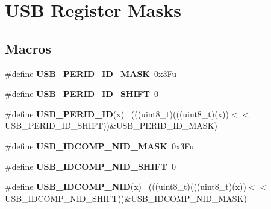 \hypertarget{group___u_s_b___register___masks}{}\section{U\+S\+B Register Masks}
\label{group___u_s_b___register___masks}
\subsection*{Macros}
\begin{DoxyCompactItemize}
\item 
\hypertarget{group___u_s_b___register___masks_ga7c4ef4c7ba738b9ec7ee90c6c482c1e5}{}\#define {\bfseries U\+S\+B\+\_\+\+P\+E\+R\+I\+D\+\_\+\+I\+D\+\_\+\+M\+A\+S\+K}~0x3\+Fu\label{group___u_s_b___register___masks_ga7c4ef4c7ba738b9ec7ee90c6c482c1e5}

\item 
\hypertarget{group___u_s_b___register___masks_ga15b2af97cadcb108b2489e2d29e8957e}{}\#define {\bfseries U\+S\+B\+\_\+\+P\+E\+R\+I\+D\+\_\+\+I\+D\+\_\+\+S\+H\+I\+F\+T}~0\label{group___u_s_b___register___masks_ga15b2af97cadcb108b2489e2d29e8957e}

\item 
\hypertarget{group___u_s_b___register___masks_ga9866908546596794c6ec34ce8e7ee9ab}{}\#define {\bfseries U\+S\+B\+\_\+\+P\+E\+R\+I\+D\+\_\+\+I\+D}(x)                                                ~(((uint8\+\_\+t)(((uint8\+\_\+t)(x))$<$$<$U\+S\+B\+\_\+\+P\+E\+R\+I\+D\+\_\+\+I\+D\+\_\+\+S\+H\+I\+F\+T))\&U\+S\+B\+\_\+\+P\+E\+R\+I\+D\+\_\+\+I\+D\+\_\+\+M\+A\+S\+K)\label{group___u_s_b___register___masks_ga9866908546596794c6ec34ce8e7ee9ab}

\item 
\hypertarget{group___u_s_b___register___masks_ga91e5cef0c6203ea503c01ecb0f392819}{}\#define {\bfseries U\+S\+B\+\_\+\+I\+D\+C\+O\+M\+P\+\_\+\+N\+I\+D\+\_\+\+M\+A\+S\+K}~0x3\+Fu\label{group___u_s_b___register___masks_ga91e5cef0c6203ea503c01ecb0f392819}

\item 
\hypertarget{group___u_s_b___register___masks_gabb5fe5f72dcf289ba2d624ed18f8f07a}{}\#define {\bfseries U\+S\+B\+\_\+\+I\+D\+C\+O\+M\+P\+\_\+\+N\+I\+D\+\_\+\+S\+H\+I\+F\+T}~0\label{group___u_s_b___register___masks_gabb5fe5f72dcf289ba2d624ed18f8f07a}

\item 
\hypertarget{group___u_s_b___register___masks_ga45629f99413060a8de87dd44e42f4f31}{}\#define {\bfseries U\+S\+B\+\_\+\+I\+D\+C\+O\+M\+P\+\_\+\+N\+I\+D}(x)                                            ~(((uint8\+\_\+t)(((uint8\+\_\+t)(x))$<$$<$U\+S\+B\+\_\+\+I\+D\+C\+O\+M\+P\+\_\+\+N\+I\+D\+\_\+\+S\+H\+I\+F\+T))\&U\+S\+B\+\_\+\+I\+D\+C\+O\+M\+P\+\_\+\+N\+I\+D\+\_\+\+M\+A\+S\+K)\label{group___u_s_b___register___masks_ga45629f99413060a8de87dd44e42f4f31}


\end{DoxyCompactItemize}
